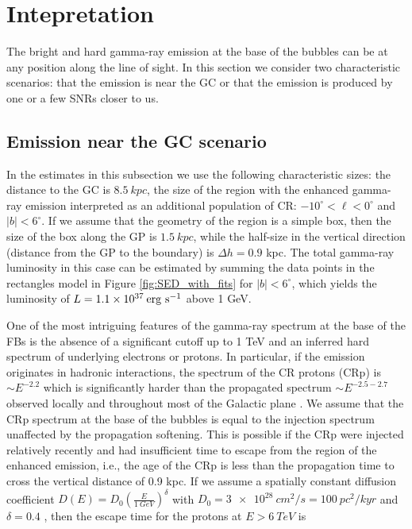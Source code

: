 \section{Intepretation}
\label{sec:Interpretation}

The bright and hard gamma-ray emission at the base of the bubbles can be at any position along the line of sight.
In this section we consider two characteristic scenarios: that the emission is near the GC or that the emission is 
produced by one or a few SNRs closer to us. 

\subsection{Emission near the GC scenario}

In the estimates in this subsection we use the following characteristic sizes: 
the distance to the GC is $\SI{8.5}{kpc}$, 
the size of the region with the enhanced gamma-ray emission interpreted as an additional population of CR:
$-10^\circ < \ell < 0^\circ$ and $|b| < 6^\circ$.
If we assume that the geometry of the region is a simple box, then the size of the box along the GP is $\SI{1.5}{kpc}$,
while the half-size in the vertical direction (distance from the GP to the boundary) is $\Delta h = 0.9$ kpc.
The total gamma-ray luminosity in this case can be estimated 
by summing the data points in the rectangles model in Figure \ref{fig:SED_with_fits}
for $|b| < 6^\circ$, which yields the luminosity of $L = 1.1 \times 10^{37}\:{\rm erg\ s^{-1}}$ above 1 GeV.

One of the most intriguing features of the gamma-ray spectrum at the base of the FBs is the absence of a significant cutoff up to 1 TeV and 
an inferred hard spectrum of underlying electrons or protons.
In particular, if the emission originates in hadronic interactions, the spectrum of the CR protons (CRp) is $\sim E^{-2.2}$ which is significantly harder than the propagated spectrum
$\sim E^{-2.5 - 2.7}$ observed locally and throughout most of the Galactic plane \citep{2016ApJS..223...26A}.
We assume that the CRp spectrum at the base of the bubbles is equal to the injection spectrum unaffected by the 
propagation softening.
This is possible if the CRp were injected relatively recently and had insufficient time to escape from the region of the enhanced emission,
i.e., the age of the CRp is less than the propagation time to cross the vertical distance of 0.9 kpc.
If we assume a spatially constant diffusion coefficient $D(E) = D_0\left(\frac{E}{\SI{1}{GeV}}\right)^\delta$ with 
$D_0 = \SI{3e28}{cm^2/s} = \SI{100}{pc^2/kyr}$ and $\delta = 0.4$ \citep{2007ARNPS..57..285S},
then the escape time for the protons at $E > \SI{6}{TeV}$ is 

